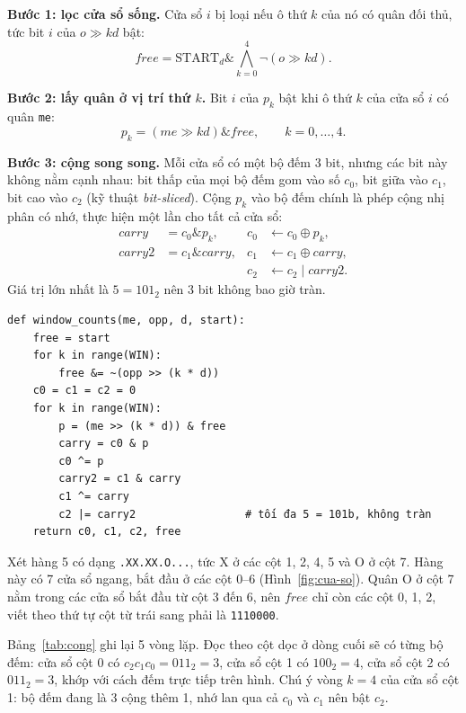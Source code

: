 \textbf{Bước 1: lọc cửa sổ sống.} Cửa sổ $i$ bị loại nếu ô thứ $k$ của nó có quân đối thủ, tức bit $i$ của $o \gg kd$ bật:
\begin{equation}
  \mathit{free} = \mathrm{START}_d \mathbin{\&} \bigwedge_{k=0}^{4} \lnot(o \gg kd).
\end{equation}

\textbf{Bước 2: lấy quân ở vị trí thứ $k$.} Bit $i$ của $p_k$ bật khi ô thứ $k$ của cửa sổ $i$ có quân \texttt{me}:
\begin{equation}
  p_k = (\mathit{me} \gg kd) \mathbin{\&} \mathit{free}, \qquad k = 0, \dots, 4.
\end{equation}

\textbf{Bước 3: cộng song song.} Mỗi cửa sổ có một bộ đếm 3 bit, nhưng các bit này không nằm cạnh nhau: bit thấp của mọi bộ đếm gom vào số $c_0$, bit giữa vào $c_1$, bit cao vào $c_2$ (kỹ thuật \emph{bit-sliced}). Cộng $p_k$ vào bộ đếm chính là phép cộng nhị phân có nhớ, thực hiện một lần cho tất cả cửa sổ:
\begin{align}
  \mathit{carry} &= c_0 \mathbin{\&} p_k, & c_0 &\leftarrow c_0 \oplus p_k, \\
  \mathit{carry2} &= c_1 \mathbin{\&} \mathit{carry}, & c_1 &\leftarrow c_1 \oplus \mathit{carry}, \\
  & & c_2 &\leftarrow c_2 \mid \mathit{carry2}.
\end{align}
Giá trị lớn nhất là $5 = 101_2$ nên 3 bit không bao giờ tràn.

\noindent\begin{minipage}{\linewidth}
\begin{lstlisting}[caption={Đếm cửa sổ song song trong caro/engine/bitboard.py.}, label={lst:window-counts}, numbers=none]
def window_counts(me, opp, d, start):
    free = start
    for k in range(WIN):
        free &= ~(opp >> (k * d))
    c0 = c1 = c2 = 0
    for k in range(WIN):
        p = (me >> (k * d)) & free
        carry = c0 & p
        c0 ^= p
        carry2 = c1 & carry
        c1 ^= carry
        c2 |= carry2                 # tối đa 5 = 101b, không tràn
    return c0, c1, c2, free
\end{lstlisting}
\end{minipage}

\begin{vidu}
\label{vd:cua-so}
Xét hàng 5 có dạng \texttt{.XX.XX.O...}, tức X ở các cột 1, 2, 4, 5 và O ở cột 7. Hàng này có 7 cửa sổ ngang, bắt đầu ở các cột 0--6 (Hình~\ref{fig:cua-so}). Quân O ở cột 7 nằm trong các cửa sổ bắt đầu từ cột 3 đến 6, nên $\mathit{free}$ chỉ còn các cột 0, 1, 2, viết theo thứ tự cột từ trái sang phải là \texttt{1110000}.

Bảng~\ref{tab:cong} ghi lại 5 vòng lặp. Đọc theo cột dọc ở dòng cuối sẽ có từng bộ đếm: cửa sổ cột 0 có $c_2 c_1 c_0 = 011_2 = 3$, cửa sổ cột 1 có $100_2 = 4$, cửa sổ cột 2 có $011_2 = 3$, khớp với cách đếm trực tiếp trên hình. Chú ý vòng $k = 4$ của cửa sổ cột 1: bộ đếm đang là 3 cộng thêm 1, nhớ lan qua cả $c_0$ và $c_1$ nên bật $c_2$.
\end{vidu}

